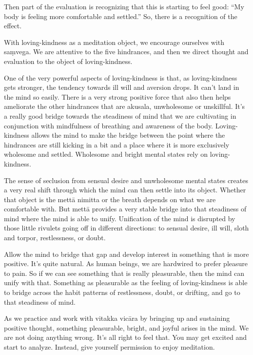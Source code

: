 Then part of the evaluation is recognizing that this is starting to feel
good: “My body is feeling more comfortable and settled.” So, there is a
recognition of the effect.

With loving-kindness as a meditation object, we encourage ourselves with
saṃvega. We are attentive to the five hindrances, and then we direct
thought and evaluation to the object of loving-kindness.

One of the very powerful aspects of loving-kindness is that, as
loving-kindness gets stronger, the tendency towards ill will and
aversion drops. It can’t land in the mind so easily. There is a very
strong positive force that also then helps ameliorate the other
hindrances that are akusala, unwholesome or unskillful. It’s a really
good bridge towards the steadiness of mind that we are cultivating in
conjunction with mindfulness of breathing and awareness of the body.
Loving-kindness allows the mind to make the bridge between the point
where the hindrances are still kicking in a bit and a place where it is
more exclusively wholesome and settled. Wholesome and bright mental
states rely on loving-kindness.

The sense of seclusion from sensual desire and unwholesome mental states
creates a very real shift through which the mind can then settle into
its object. Whether that object is the mettā nimitta or the breath
depends on what we are comfortable with. But mettā provides a very
stable bridge into that steadiness of mind where the mind is able to
unify. Unification of the mind is disrupted by those little rivulets
going off in different directions: to sensual desire, ill will, sloth
and torpor, restlessness, or doubt.

Allow the mind to bridge that gap and develop interest in something that
is more positive. It’s quite natural. As human beings, we are hardwired
to prefer pleasure to pain. So if we can see something that is really
pleasurable, then the mind can unify with that. Something as pleasurable
as the feeling of loving-kindness is able to bridge across the habit
patterns of restlessness, doubt, or drifting, and go to that steadiness
of mind.

As we practice and work with vitakka vicāra by bringing up and
sustaining positive thought, something pleasurable, bright, and joyful
arises in the mind. We are not doing anything wrong. It’s all right to
feel that. You may get excited and start to analyze. Instead, give
yourself permission to enjoy meditation.

